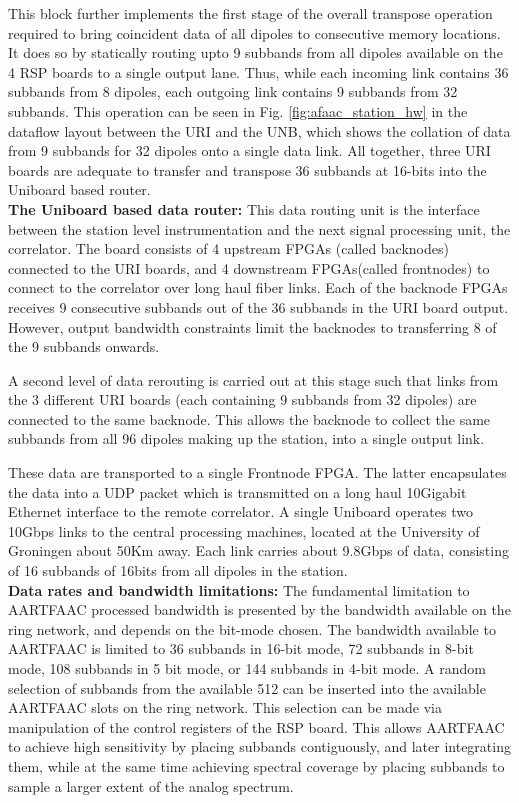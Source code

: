 \documentclass{ws-jai}
\begin{document}
This block further implements the first stage of the overall transpose operation
required  to  bring  coincident  data  of  all  dipoles  to  consecutive  memory
locations.  It  does so by statically  routing upto 9 subbands  from all dipoles
available on the 4 RSP boards to a single output lane. Thus, while each incoming
link contains 36 subbands from 8 dipoles, each outgoing link contains 9 subbands
from    32    subbands.     This    operation    can    be    seen    in    Fig.
\ref{fig:afaac_station_hw} in the  dataflow layout between the URI  and the UNB,
which shows the collation  of data from 9 subbands for 32  dipoles onto a single
data  link.   All together,  three  URI  boards  are  adequate to  transfer  and
transpose 36 subbands at 16-bits into the Uniboard based router.\\

\noindent \textbf  {The Uniboard based data  router:} This data routing  unit is
the  interface between  the station  level instrumentation  and the  next signal
processing unit, the correlator. The board  consists of 4 upstream FPGAs (called
backnodes)  connected  to   the  URI  boards,  and   4  downstream  FPGAs(called
frontnodes) to  connect to the correlator  over long haul fiber  links.  Each of
the backnode FPGAs receives 9 consecutive subbands out of the 36 subbands in the
URI board output.  However, output bandwidth constraints limit  the backnodes to
transferring 8 of the 9 subbands onwards.

A second level  of data rerouting is  carried out at this stage  such that links
from the 3 different URI boards (each containing 9 subbands from 32 dipoles) are
connected to  the same backnode.  This allows the  backnode to collect  the same
subbands from all 96  dipoles making up the station, into  a single output link.

These data are transported to a  single Frontnode FPGA.  The latter encapsulates
the  data into  a UDP  packet  which is  transmitted  on a  long haul  10Gigabit
Ethernet interface  to the  remote correlator.  A  single Uniboard  operates two
10Gbps links  to the central processing  machines, located at the  University of
Groningen about 50Km away.  Each link  carries about 9.8Gbps of data, consisting
of 16 subbands of 16bits from all dipoles in the station.\\

\noindent  \textbf {Data  rates  and bandwidth  limitations:  } The  fundamental
limitation  to  AARTFAAC  processed  bandwidth is  presented  by  the  bandwidth
available  on  the ring  network,  and  depends  on  the bit-mode  chosen.   The
bandwidth available  to AARTFAAC is  limited to 36  subbands in 16-bit  mode, 72
subbands in  8-bit mode, 108 subbands  in 5 bit  mode, or 144 subbands  in 4-bit
mode.  A  random selection of  subbands from the  available 512 can  be inserted
into the  available AARTFAAC slots on  the ring network.  This  selection can be
made via  manipulation of the control  registers of the RSP  board.  This allows
AARTFAAC to achieve high sensitivity by placing subbands contiguously, and later
integrating them, while at the same  time achieving spectral coverage by placing
subbands to sample a larger extent of the analog spectrum.\\
\end{document}
